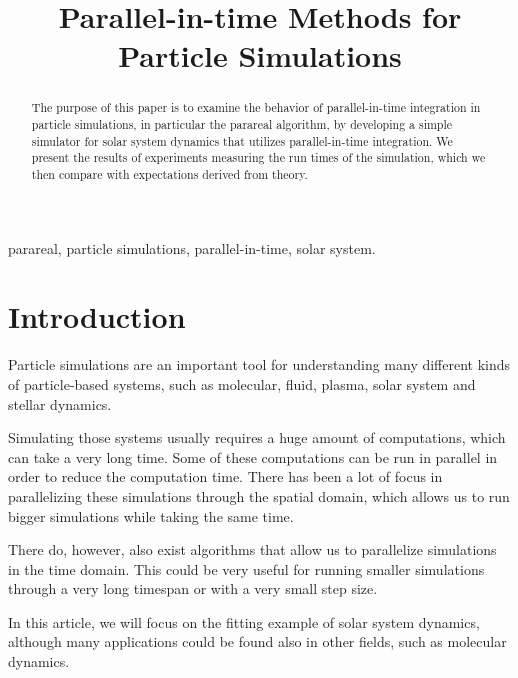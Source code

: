 \documentclass[conference]{IEEEtran}
\begin{document}
\title{Parallel-in-time Methods for Particle Simulations}

\author{
}

\maketitle

\begin{abstract}
The purpose of this paper is to examine the behavior of parallel-in-time integration in particle simulations, in particular the parareal algorithm, by developing a simple simulator for solar system dynamics that utilizes parallel-in-time integration. We present the results of experiments measuring the run times of the simulation, which we then compare with expectations derived from theory.
\end{abstract}

\begin{IEEEkeywords}
parareal, particle simulations, parallel-in-time, solar system.
\end{IEEEkeywords}

\section{Introduction}

Particle simulations are an important tool for understanding many different kinds of particle-based systems, such as molecular, fluid, plasma, solar system and stellar dynamics.

Simulating those systems usually requires a huge amount of computations, which can take a very long time. Some of these computations can be run in parallel in order to reduce the computation time. There has been a lot of focus in parallelizing these simulations through the spatial domain, which allows us to run bigger simulations while taking the same time.

There do, however, also exist algorithms that allow us to parallelize simulations in the time domain. This could be very useful for running smaller simulations through a very long timespan or with a very small step size. 

In this article, we will focus on the fitting example of solar system dynamics, although many applications could be found also in other fields, such as molecular dynamics. \cite{moldyn}
\end{document}
